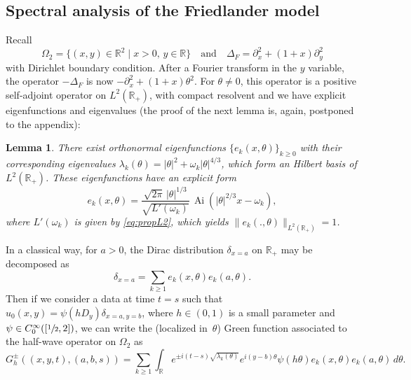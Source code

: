 \documentclass[11pt]{article}
\newcommand{\quand}{\quad\text{and}\quad}
\DeclareMathOperator{\Ai}{Ai}
\theoremstyle{plain}
\newtheorem{lemma}{Lemma}
\theoremstyle{definition}
\begin{document}
\subsection{Spectral analysis of the Friedlander model}

Recall
\[
\Omega_2=\{(x,y)\in\mathbb{R}^2\mid x>0,\,y\in\mathbb{R}\}\quand
\Delta_F=\partial^{2}_{x}+(1+x)\partial^{2}_{y}
\]
with Dirichlet boundary condition. After a Fourier transform in the $y$ variable, the operator $-\Delta_{F}$ is now
$-\partial^2_x+(1+x)\theta^2$. For $\theta\neq 0$, this operator is a positive self-adjoint operator
on $L^2(\mathbb{R}_+)$, with compact resolvent and we have explicit eigenfunctions and eigenvalues (the proof of the next lemma is, again, postponed to the appendix):

\begin{lemma}\label{lemorthog}
There exist orthonormal eigenfunctions $\{e_k(x,\theta)\}_{k\geq 0}$ with their corresponding eigenvalues $\lambda_k(\theta)=|\theta|^2+\omega_k|\theta|^{4/3}$, which form an Hilbert basis of $L^{2}(\mathbb{R}_{+})$. These eigenfunctions have an explicit form
\begin{equation}\label{eig_k}
e_k(x,\theta)=\frac{\sqrt{2\pi}\,|\theta|^{1/3}}{\sqrt{L'(\omega_k)}}\,
\Ai(|\theta|^{2/3}x-\omega_k),
\end{equation}
where $L'(\omega_k)$ is given by \eqref{eq:propL2}, which yields
$\|e_k(.,\theta)\|_{L^2(\mathbb{R}_+)}=1$.
\end{lemma}

In a classical way, for $a>0$, the Dirac distribution $\delta_{x=a}$ on $\mathbb{R}_+$ may be decomposed as
\[
\delta_{x=a}=\sum_{k\geq 1} e_k(x,\theta)e_k(a,\theta).
\]
Then if we consider a data at time $t=s$ such that
$u_0(x,y)=\psi(hD_y)\delta_{x=a,y=b}$, where $h\in (0,1)$ is a small parameter and
$\psi\in C^{\infty}_0([\sfrac 12,2])$, we can write the (localized in~$\theta$) Green function associated to the half-wave operator on $\Omega_{2}$ as
\begin{equation}
\label{greenfct} G^{\pm}_{h}((x,y,t),(a,b,s))=\sum_{k\geq 1}
\int_{\mathbb{R}}e^{\pm i(t-s)\sqrt{\lambda_k(\theta)}}
e^{i(y-b)\theta}
\psi(h\theta)e_k(x,\theta)e_k(a,\theta)\,d\theta.
\end{equation}
\end{document}
